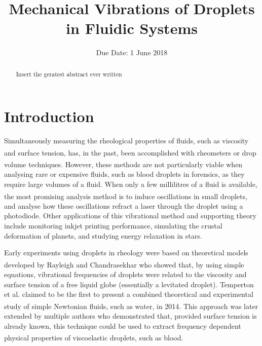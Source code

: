\documentclass{physics_article_B}
\title{Mechanical Vibrations of Droplets in Fluidic Systems}
\date{Due Date: 1 June 2018}
\begin{document}
	
\setcounter{page}{0}
%

\begin{abstract}
	\large{Insert the geratest abstract ever written 
}
\end{abstract}
	

\tableofcontents

\setcounter{page}{1}
\setlength{\parskip}{8pt}  
\newpage
{} 
\setcounter{page}{1}

\section{Introduction\label{sect:intro}}

    Simultaneously measuring the rheological properties of fluids, such as viscosity and surface tension, has, in the past, been accomplished with rheometers\textsuperscript{\cite{harrold2}} or drop volume techniques\textsuperscript{\cite{harrold2}}. However, these methods are not particularly viable when analysing rare or expensive fluids, such as blood droplets in forensics, as they require large volumes of a fluid. When only a few millilitres of a fluid is available, the most promising analysis method is to induce oscillations in small droplets\textsuperscript{\cite{harrold}}, and analyse how these oscillations refract a laser through the droplet using a photodiode. Other applications of this vibrational method and supporting theory include monitoring inkjet printing performance\cite{Martin2008}, simulating the crustal deformation of planets\cite{vukasinovic}, and studying energy relaxation in stars\cite{vukasinovic}.
    
    Early experiments using droplets in rheology were based on theoretical models developed by Rayleigh\textsuperscript{\cite{rayleigh}} and Chandrasekhar\textsuperscript{\cite{chandrasekhar2}} who showed that, by using simple equations, vibrational frequencies of droplets were related to the viscosity and surface tension of a free liquid globe (essentially a levitated droplet). Temperton et al. claimed to be the first to present a combined theoretical and experimental study of simple Newtonian fluids, such as water, in 2014\textsuperscript{\cite{temperton}}. This approach was later extended by multiple authors who demonstrated that, provided surface tension is already known, this technique could be used to extract frequency dependent physical properties of viscoelastic droplets, such as blood\textsuperscript{\cite{egry}}. 
    
\end{document}
